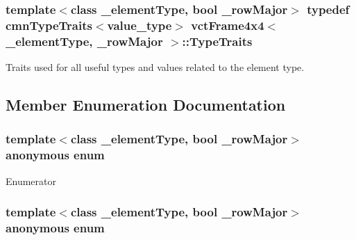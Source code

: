 \subsubsection[{Type\+Traits}]{\setlength{\rightskip}{0pt plus 5cm}template$<$class \+\_\+element\+Type, bool \+\_\+row\+Major$>$ typedef {\bf cmn\+Type\+Traits}$<$value\+\_\+type$>$ {\bf vct\+Frame4x4}$<$ \+\_\+element\+Type, \+\_\+row\+Major $>$\+::{\bf Type\+Traits}}\label{classvct_frame4x4_af8bf02c629bad73636da990ce9106fcf}
Traits used for all useful types and values related to the element type. 

\subsection{Member Enumeration Documentation}
\hypertarget{classvct_frame4x4_ab47fb26bf5a63b1dd8dc3257181103ed}{}\subsubsection[{anonymous enum}]{\setlength{\rightskip}{0pt plus 5cm}template$<$class \+\_\+element\+Type, bool \+\_\+row\+Major$>$ anonymous enum}\label{classvct_frame4x4_ab47fb26bf5a63b1dd8dc3257181103ed}
\begin{Desc}
\item[Enumerator]\par
\begin{description}
\item[{\em 
\hypertarget{classvct_frame4x4_ab47fb26bf5a63b1dd8dc3257181103eda76a3fe8d4faebc4fd854e2a2768f7dae}{}R\+O\+W\+S\label{classvct_frame4x4_ab47fb26bf5a63b1dd8dc3257181103eda76a3fe8d4faebc4fd854e2a2768f7dae}
}]\item[{\em 
\hypertarget{classvct_frame4x4_ab47fb26bf5a63b1dd8dc3257181103eda7c50eb46d3929353c661aa63859a5b45}{}C\+O\+L\+S\label{classvct_frame4x4_ab47fb26bf5a63b1dd8dc3257181103eda7c50eb46d3929353c661aa63859a5b45}
}]\end{description}
\end{Desc}
\hypertarget{classvct_frame4x4_a5e333262820027530265ceadfd397d78}{}\subsubsection[{anonymous enum}]{\setlength{\rightskip}{0pt plus 5cm}template$<$class \+\_\+element\+Type, bool \+\_\+row\+Major$>$ anonymous enum}\label{classvct_frame4x4_a5e333262820027530265ceadfd397d78}
